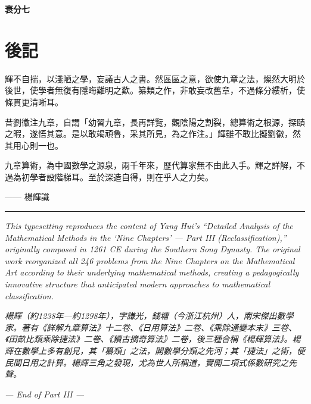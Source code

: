 \documentclass[11pt,a4paper]{article}
\newcommand{\longline}{\noindent\rule{\textwidth}{0.4pt}}
\newenvironment{problemenv}[1]{%
  \medskip\noindent\textbf{#1}\par\nopagebreak\smallskip
}{\medskip}
\begin{document}
\begin{problemenv}{衰分七}
\section*{後記}

輝不自揣，以淺陋之學，妄議古人之書。然區區之意，欲使九章之法，燦然大明於後世，使學者無復有隱晦難明之歎。纂類之作，非敢妄改舊章，不過條分縷析，使條貫更清晰耳。

昔劉徽注九章，自謂「幼習九章，長再詳覽，觀陰陽之割裂，總算術之根源，探賾之暇，遂悟其意。是以敢竭頑魯，采其所見，為之作注。」輝雖不敢比擬劉徽，然其用心則一也。

九章算術，為中國數學之源泉，兩千年來，歷代算家無不由此入手。輝之詳解，不過為初學者設階梯耳。至於深造自得，則在乎人之力矣。

\begin{flushright}
—— 楊輝識
\end{flushright}

\medskip
\longline

\vspace{1cm}

\noindent\textit{This typesetting reproduces the content of Yang Hui's ``Detailed Analysis of the Mathematical Methods in the `Nine Chapters' --- Part III (Reclassification),'' originally composed in 1261 CE during the Southern Song Dynasty. The original work reorganized all 246 problems from the \textit{Nine Chapters on the Mathematical Art} according to their underlying mathematical methods, creating a pedagogically innovative structure that anticipated modern approaches to mathematical classification.}

\vspace{0.5cm}

\noindent\textit{楊輝（約1238年—約1298年），字謙光，錢塘（今浙江杭州）人，南宋傑出數學家。著有《詳解九章算法》十二卷、《日用算法》二卷、《乘除通變本末》三卷、《田畝比類乘除捷法》二卷、《續古摘奇算法》二卷，後三種合稱《楊輝算法》。楊輝在數學上多有創見，其「纂類」之法，開數學分類之先河；其「捷法」之術，便民間日用之計算。楊輝三角之發現，尤為世人所稱道，實開二項式係數研究之先聲。}

\vspace{1cm}

\begin{flushright}
\textit{--- End of Part III ---}
\end{flushright}
\end{document}
